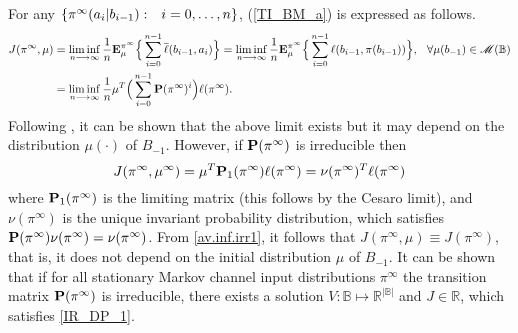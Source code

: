\documentclass[11pt, a4paper, journal,onecolumn]{IEEEtran}
\newcommand{\mb}{\mathbb}
\newcommand{\hso}{\hspace{.1in}}
\begin{document}
 For any $\{\pi^{\infty}(a_i|b_{i-1}): \hso i=0, \ldots, n\}$, (\ref{TI_BM_a})  is expressed  as follows. 
\begin{align}
J(\pi^{\infty},\mu)&=\liminf_{n\longrightarrow \infty}\frac{1}{n}{\bf E}_{\mu}^{\pi^{\infty}}\Big\{\sum_{i=0}^{n-1}\overline{\ell}(b_{i-1},a_i)\Big\}=  \liminf_{n\longrightarrow \infty}\frac{1}{n}  {\bf E}_{\mu}^{\pi^{\infty}}\Big\{\sum_{i=0}^{n-1}\ell(b_{i-1},\pi(b_{i-1}))\Big\}, \hso \forall \mu(b_{-1}) \in {\cal M}({\mb B})\label{av.inf.c}\\
&=\liminf_{n\longrightarrow \infty}\frac{1}{n}\mu^T\Big(\sum_{i=0}^{n-1}{\bf P}(\pi^{\infty})^i\Big)\ell(\pi^{\infty}).
\end{align}
Following  \cite{bertsekas05},  it can be shown that the above limit exists but it may depend on the distribution $\mu(\cdot)$ of $B_{-1}$. However, if ${\bf P}(\pi^{\infty})$ is irreducible  then 
\begin{equation}\label{av.inf.irr1}
J(\pi^{\infty}, \mu^{\infty})=\mu^T {\bf P}_1(\pi^{\infty})\ell(\pi^{\infty})=\nu(\pi^{\infty})^T\ell(\pi^{\infty})
\end{equation}
where ${\bf P}_1(\pi^{\infty})$ is the limiting matrix (this follows by the  Cesaro limit), and $\nu(\pi^{\infty})$ is the unique invariant probability distribution, which satisfies  ${\bf P}(\pi^{\infty})\nu(\pi^{\infty})=\nu(\pi^{\infty})$. From \eqref{av.inf.irr1}, it follows that  $J(\pi^{\infty}, \mu) \equiv J(\pi^{\infty})$, that is, it does not depend on the initial distribution $\mu$ of $B_{-1}$. It can be shown that  if for all stationary Markov channel input distributions $\pi^\infty$ the transition matrix ${\bf P}(\pi^\infty)$ is irreducible, there exists a solution $V:\mathbb{B}\mapsto \mathbb{R}^{|\mathbb{B}|}$ and $J\in \mathbb{R}$, which satisfies \eqref{IR_DP_1}.
\end{document}
